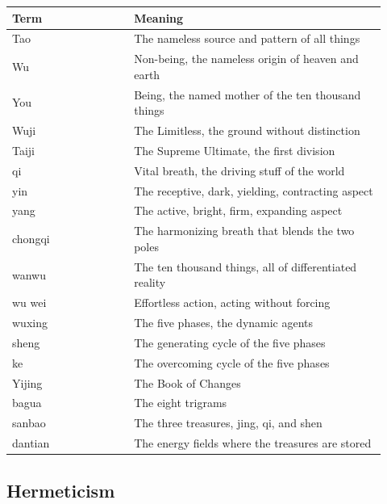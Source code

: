 \begin{longtable}{L{0.30\linewidth} L{0.62\linewidth}}
\toprule
\textbf{Term} & \textbf{Meaning} \\
\midrule
\endhead
Tao & The nameless source and pattern of all things \\
Wu & Non-being, the nameless origin of heaven and earth \\
You & Being, the named mother of the ten thousand things \\
Wuji & The Limitless, the ground without distinction \\
Taiji & The Supreme Ultimate, the first division \\
qi & Vital breath, the driving stuff of the world \\
yin & The receptive, dark, yielding, contracting aspect \\
yang & The active, bright, firm, expanding aspect \\
chongqi & The harmonizing breath that blends the two poles \\
wanwu & The ten thousand things, all of differentiated reality \\
wu wei & Effortless action, acting without forcing \\
wuxing & The five phases, the dynamic agents \\
sheng & The generating cycle of the five phases \\
ke & The overcoming cycle of the five phases \\
Yijing & The Book of Changes \\
bagua & The eight trigrams \\
sanbao & The three treasures, jing, qi, and shen \\
dantian & The energy fields where the treasures are stored \\
\bottomrule
\end{longtable}

\subsection{Hermeticism}

